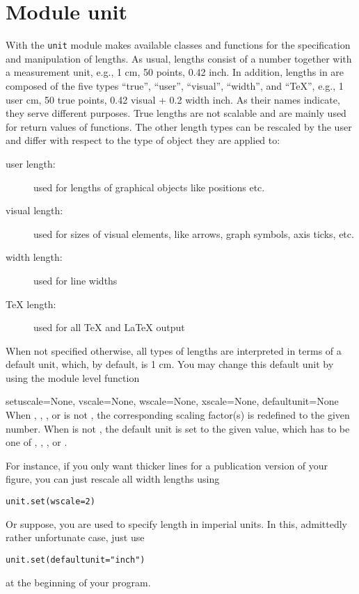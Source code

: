 \chapter{Module unit}
\label{unit}



With the \verb|unit| module \PyX{} makes available classes and
functions for the specification and manipulation of lengths. As usual,
lengths consist of a number together with a measurement unit, e.g.,
1 cm, 50 points, 0.42 inch.  In addition,
lengths in \PyX{} are composed of the five types ``true'', ``user'',
``visual'', ``width'', and ``\TeX'', e.g., 1 user cm,
50 true points, 0.42 visual + 0.2 width inch.  As their names
indicate, they serve different purposes. True lengths are not scalable
and are mainly used for return values of \PyX{} functions.  The other
length types can be rescaled by the user and differ with respect to
the type of object they are applied to:

\begin{description}
\item[user length:] used for lengths of graphical objects like
  positions etc.
\item[visual length:] used for sizes of visual elements, like arrows,
  graph symbols, axis ticks, etc.
\item[width length:] used for line widths
\item[\TeX{} length:] used for all \TeX{} and \LaTeX{} output
\end{description}

    When not specified otherwise, all types of lengths are interpreted
in terms of a default unit, which, by default, is 1 cm.
You may change this default unit by using the module level function
\begin{funcdesc}{set}{uscale=None, vscale=None, wscale=None,
xscale=None, defaultunit=None}
When , , , or  is not
, the corresponding scaling factor(s) is redefined to
the given number. When  is not , 
the default unit is set to the given value, which has to be
one of , , , or .
\end{funcdesc}

For instance, if you only want thicker lines for a publication
version of your figure, you can just rescale all width lengths using
\begin{verbatim}
unit.set(wscale=2)
\end{verbatim}
Or suppose, you are used to specify length in imperial units. In this,
admittedly rather unfortunate case, just use
\begin{verbatim}
unit.set(defaultunit="inch")
\end{verbatim}
at the beginning of your program.

